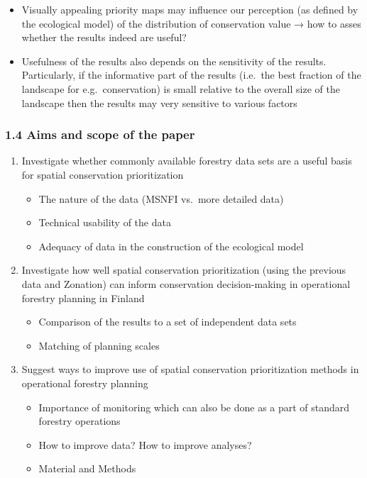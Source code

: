 \documentclass[]{article}
\begin{document}
\begin{itemize}
\itemsep1pt\parskip0pt
\item
  Visually appealing priority maps may influence our perception (as
  defined by the ecological model) of the distribution of conservation
  value → how to asses whether the results indeed are useful?
\item
  Usefulness of the results also depends on the sensitivity of the
  results. Particularly, if the informative part of the results
  (i.e.~the best fraction of the landscape for e.g.~conservation) is
  small relative to the overall size of the landscape then the results
  may very sensitive to various factors
\end{itemize}

\subsubsection{1.4 Aims and scope of the paper}

\begin{enumerate}
\def\labelenumi{\arabic{enumi}.}
\itemsep1pt\parskip0pt
\item
  Investigate whether commonly available forestry data sets are a useful
  basis for spatial conservation prioritization

  \begin{itemize}
  \itemsep1pt\parskip0pt
  \item
    The nature of the data (MSNFI vs.~more detailed data)
  \item
    Technical usability of the data
  \item
    Adequacy of data in the construction of the ecological model
  \end{itemize}
\item
  Investigate how well spatial conservation prioritization (using the
  previous data and Zonation) can inform conservation decision-making in
  operational forestry planning in Finland

  \begin{itemize}
  \itemsep1pt\parskip0pt
  \item
    Comparison of the results to a set of independent data sets
  \item
    Matching of planning scales
  \end{itemize}
\item
  Suggest ways to improve use of spatial conservation prioritization
  methods in operational forestry planning

  \begin{itemize}
  \itemsep1pt\parskip0pt
  \item
    Importance of monitoring which can also be done as a part of
    standard forestry operations
  \item
    How to improve data? How to improve analyses?
  \item
    Material and Methods
  \end{itemize}
\end{enumerate}
\end{document}

